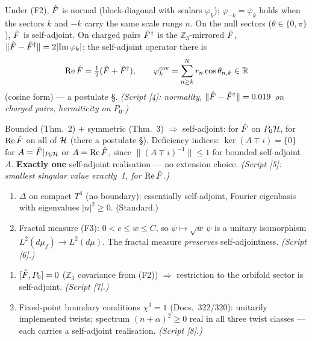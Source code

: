 \begin{tcolorbox}[proofbox, title={Theorem 3 — $\mathbb{Z}_3$ pairing: normality \B, symmetry on $P_0$ \B}]
  Under (F2), $\hat{F}$ is normal (block-diagonal with scalars $\varphi_k$);
  $\varphi_{-k} = \bar\varphi_k$ holds when the sectors $k$ and $-k$
  carry the same scale rungs $n$.
  On the null sectors ($\theta \in \{0,\pi\}$), $\hat{F}$ is self-adjoint.
  On charged pairs $\hat{F}^\dagger$ is the $\mathbb{Z}_3$-mirrored $\hat{F}$,
  $\|\hat{F}-\hat{F}^\dagger\| = 2|\mathrm{Im}\,\varphi_k|$;
  the self-adjoint operator there is
  \[
    \mathrm{Re}\,\hat{F} = \tfrac12(\hat{F}+\hat{F}^\dagger), \qquad
    \varphi_k^{\text{cov}} = \sum_{n\ge k}^{N} r_n \cos\theta_{n,k} \in \mathbb{R}
  \]
  (cosine form) — a postulate \S.
  \emph{(Script [4]: normality, $\|\hat{F}-\hat{F}^\dagger\| = 0.019$ on charged pairs, hermiticity on $P_0$.)}
\end{tcolorbox}

\begin{tcolorbox}[proofbox, title={Corollary 4 — Self-adjointness, deficiency indices $(0,0)$ \B\ on $P_0$}]
  Bounded (Thm.~2) $+$ symmetric (Thm.~3)
  $\Rightarrow$ self-adjoint: for $\hat{F}$ on $P_0\mathcal{H}$, for
  $\mathrm{Re}\,\hat{F}$ on all of $\mathcal{H}$ (there a postulate \S).
  Deficiency indices:
  $\ker(A \mp i) = \{0\}$ for $A = \hat{F}|_{P_0\mathcal{H}}$ or $A = \mathrm{Re}\,\hat{F}$,
  since $\|(A \mp i)^{-1}\| \le 1$ for bounded self-adjoint $A$.
  \textbf{Exactly one} self-adjoint realisation — no extension choice.
  \emph{(Script [5]: smallest singular value exactly~1, for $\mathrm{Re}\,\hat{F}$.)}
\end{tcolorbox}

\begin{tcolorbox}[proofbox, title={Theorem 5 — Tensor factor $\hat\Delta_{T^4}$ with fractal measure \B}]
  \begin{enumerate}
    \item $\Delta$ on compact $T^4$ (no boundary): essentially self-adjoint,
      Fourier eigenbasis with eigenvalues $|n|^2 \ge 0$. (Standard.)
    \item Fractal measure (F3): $0 < c \le w \le C$, so
      $\psi \mapsto \sqrt{w}\,\psi$ is a unitary isomorphism
      $L^2(d\mu_f) \to L^2(d\mu)$.
      The fractal measure \emph{preserves} self-adjointness.
      \emph{(Script [6].)}
  \end{enumerate}
\end{tcolorbox}

\begin{tcolorbox}[proofbox, title={Theorem 6 — $\mathbb{Z}_3$ restriction and $\chi$-twists \B}]
  \begin{enumerate}
    \item $[\hat{F}, P_0] = 0$ ($\mathbb{Z}_3$ covariance from (F2))
      $\Rightarrow$ restriction to the orbifold sector is self-adjoint.
      \emph{(Script [7].)}
    \item Fixed-point boundary conditions $\chi^3 = 1$ (Docs.~322/320):
      unitarily implemented twists; spectrum $(n+\alpha)^2 \ge 0$ real
      in all three twist classes — each carries a self-adjoint realisation.
      \emph{(Script [8].)}
  \end{enumerate}
\end{tcolorbox}

